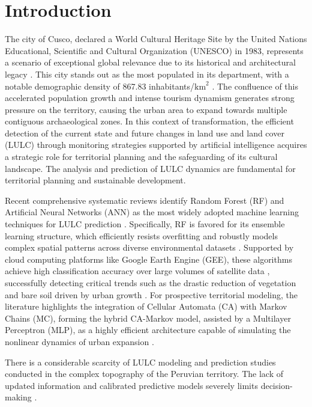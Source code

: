 \documentclass[runningheads]{llncs}
\begin{document}
\section{Introduction}
\label{sec:intro}

The city of Cusco, declared a World Cultural Heritage Site by the United Nations Educational, Scientific and Cultural Organization (UNESCO) in 1983, represents a scenario of exceptional global relevance due to its historical and architectural legacy \cite{623_tupay}. This city stands out as the most populated in its department, with a notable demographic density of 867.83 inhabitants/$\text{km}^2$ \cite{124_compendio}. The confluence of this accelerated population growth and intense tourism dynamism generates strong pressure on the territory, causing the urban area to expand towards multiple contiguous archaeological zones. In this context of transformation, the efficient detection of the current state and future changes in land use and land cover (LULC) through monitoring strategies supported by artificial intelligence acquires a strategic role for territorial planning and the safeguarding of its cultural landscape. The analysis and prediction of LULC dynamics are fundamental for territorial planning and sustainable development. 

Recent comprehensive systematic reviews identify Random Forest (RF) and Artificial Neural Networks (ANN) as the most widely adopted machine learning techniques for LULC prediction \cite{017_Algeria,000_multiple_studies}. Specifically, RF is favored for its ensemble learning structure, which efficiently resists overfitting and robustly models complex spatial patterns across diverse environmental datasets \cite{000_multiple_studies}. Supported by cloud computing platforms like Google Earth Engine (GEE), these algorithms achieve high classification accuracy over large volumes of satellite data \cite{017_Algeria}, successfully detecting critical trends such as the drastic reduction of vegetation and bare soil driven by urban growth \cite{009_alabama}. For prospective territorial modeling, the literature highlights the integration of Cellular Automata (CA) with Markov Chains (MC), forming the hybrid CA-Markov model, assisted by a Multilayer Perceptron (MLP), as a highly efficient architecture capable of simulating the nonlinear dynamics of urban expansion \cite{414_Duan2025}.

There is a considerable scarcity of LULC modeling and prediction studies conducted in the complex topography of the Peruvian territory. The lack of updated information and calibrated predictive models severely limits decision-making \cite{001_lluviaIndia}.
\end{document}
